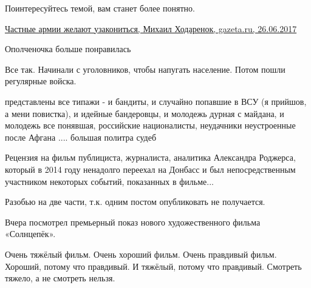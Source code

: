 \begin{itemize}
\begin{itemize}
Поинтересуйтесь темой, вам станет более понятно.

\href{https://www.gazeta.ru/army/2017/06/26/10736969.shtml}{%
Частные армии желают узакониться, Михаил Ходаренок, gazeta.ru, 26.06.2017%
}

 
Ополченочка больше понравилась

 
Все так. Начинали с уголовников, чтобы напугать население. Потом пошли регулярные войска.

 

представлены все типажи - и бандиты, и случайно попавшие в ВСУ (я прийшов, а
мени повистка), и идейные бандеровцы, и молодежь дурная с майдана, и молодежь
все понявшая, российские националисты, неудачники неустроенные после Афгана
.... большая политра судеб




Рецензия на фильм публициста, журналиста, аналитика Александра Роджерса,
который в 2014 году ненадолго переехал на Донбасс и был непосредственным
участником некоторых событий, показанных в фильме...

Разобью на две части, т.к. одним постом опубликовать не получается.

Вчера посмотрел премьерный показ нового художественного фильма «Солнцепёк».

Очень тяжёлый фильм. Очень хороший фильм. Очень правдивый фильм. Хороший,
потому что правдивый. И тяжёлый, потому что правдивый. Смотреть тяжело, а не
смотреть нельзя.


\end{itemize}
\end{itemize}
